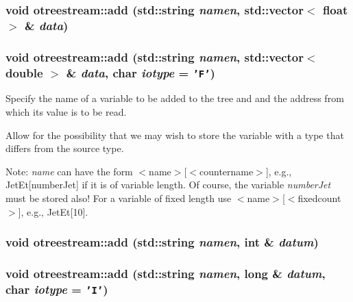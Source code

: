 \hypertarget{classotreestream_a10}{
\subsubsection[add]{\setlength{\rightskip}{0pt plus 5cm}void otreestream::add (std::string {\em namen}, std::vector$<$ float $>$ \& {\em data})}}
\label{classotreestream_a10}


\hypertarget{classotreestream_a9}{
\subsubsection[add]{\setlength{\rightskip}{0pt plus 5cm}void otreestream::add (std::string {\em namen}, std::vector$<$ double $>$ \& {\em data}, char {\em iotype} = {\tt 'F'})}}
\label{classotreestream_a9}


Specify the name of a variable to be added to the tree and and the address from which its value is to be read. 

Allow for the possibility that we may wish to store the variable with a type that differs from the source type. 

Note: {\em name\/} can have the form $<$name$>$\mbox{[}$<$countername$>$\mbox{]}, e.g., Jet\-Et\mbox{[}number\-Jet\mbox{]} if it is of variable length. Of course, the variable {\em number\-Jet\/} must be stored also! For a variable of fixed length use $<$name$>$\mbox{[}$<$fixedcount$>$\mbox{]}, e.g., Jet\-Et\mbox{[}10\mbox{]}. \hypertarget{classotreestream_a8}{
\subsubsection[add]{\setlength{\rightskip}{0pt plus 5cm}void otreestream::add (std::string {\em namen}, int \& {\em datum})}}
\label{classotreestream_a8}


\hypertarget{classotreestream_a7}{
\subsubsection[add]{\setlength{\rightskip}{0pt plus 5cm}void otreestream::add (std::string {\em namen}, long \& {\em datum}, char {\em iotype} = {\tt 'I'})}}
\label{classotreestream_a7}


